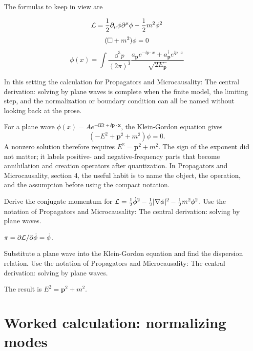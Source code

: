 The formulas to keep in view are

\[
  \mathcal L=\frac12\partial_\mu\phi\partial^\mu\phi-\frac12m^2\phi^2
\]
\[
  (\Box+m^2)\phi=0
\]
\[
  \phi(x)=\int\frac{\dd^3p}{(2\pi)^3}\frac{a_{\bm p}e^{-\ii p\cdot x}+a_{\bm p}^\dagger e^{\ii p\cdot x}}{\sqrt{2E_{\bm p}}}
\]

In this setting the calculation for Propagators and Microcausality: The central derivation: solving by plane waves is complete when the finite model, the limiting step, and the normalization or boundary condition can all be named without looking back at the prose.




\begin{example}
For a plane wave \(\phi(x)=Ae^{-\ii Et+\ii\bm p\cdot\bm x}\), the Klein-Gordon equation gives
\[
  (-E^2+\bm p^2+m^2)\phi=0.
\]
A nonzero solution therefore requires \(E^2=\bm p^2+m^2\).  The sign of the exponent did not matter; it labels positive- and negative-frequency parts that become annihilation and creation operators after quantization.  In Propagators and Microcausality, section 4, the useful habit is to name the object, the operation, and the assumption before using the compact notation.
\end{example}



\begin{exercise}
Derive the conjugate momentum for \(\mathcal L=\frac12\dot\phi^2-\frac12|\nabla\phi|^2-\frac12m^2\phi^2\).  Use the notation of Propagators and Microcausality: The central derivation: solving by plane waves.
\begin{answer}
\(\pi=\partial\mathcal L/\partial\dot\phi=\dot\phi\).
\end{answer}
\end{exercise}

\begin{exercise}
Substitute a plane wave into the Klein-Gordon equation and find the dispersion relation.  Use the notation of Propagators and Microcausality: The central derivation: solving by plane waves.
\begin{answer}
The result is \(E^2=\bm p^2+m^2\).
\end{answer}
\end{exercise}



\section{Worked calculation: normalizing modes}

